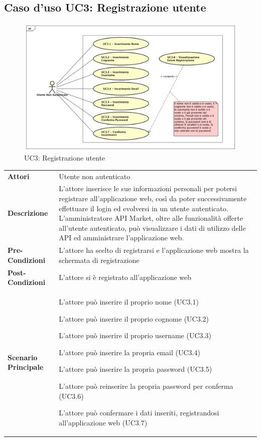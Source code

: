 \newpage
\subsection{Caso d'uso UC3:  Registrazione utente }
\label{UC3}
\begin{figure}[ht]
	\centering
	\includegraphics[scale=0.45]{UML/UC3.png}
	\caption{UC3: Registrazione utente}
\end{figure}

\begin{longtable}{ l | p{11cm}}
	\hline
	\rowcolor{Gray}
	 \multicolumn{2}{c}{UC3 - Registrazione utente} \\
	 \hline
	\textbf{Attori} & Utente non autenticato \\
	\textbf{Descrizione} & L'attore inserisce le sue informazioni personali per potersi registrare all'applicazione web, così da poter successivamente effettuare il login ed evolversi in un utente autenticato.
	L'amministratore API Market, oltre alle funzionalità offerte all'utente autenticato, può
	visualizzare i dati di utilizzo delle API ed amministrare l'applicazione web.  \\
	\textbf{Pre-Condizioni} & L'attore ha scelto di registrarsi e l'applicazione web mostra la schermata di registrazione \\
	\textbf{Post-Condizioni} & L'attore si è registrato all'applicazione web \\
	\textbf{Scenario Principale} & \begin{enumerate*}[label=(\arabic*.),itemjoin={\newline}]
		\item L'attore può inserire il proprio nome (UC3.1)
		\item L'attore può inserire il proprio cognome (UC3.2)
		\item L'attore può inserire il proprio username (UC3.3)
		\item L'attore può inserire la propria email (UC3.4) 
		\item L'attore può inserire la propria password (UC3.5)
		\item L'attore può reinserire la propria password per conferma (UC3.6)
		\item L'attore può confermare i dati inseriti, registrandosi all'applicazione web (UC3.7)
	\end{enumerate*}\\
\end{longtable}
